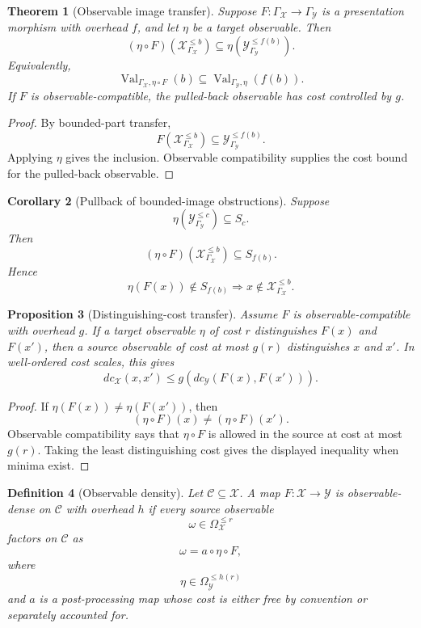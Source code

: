 \documentclass[11pt]{article}
\newtheorem{theorem}{Theorem}[section]
\newtheorem{proposition}[theorem]{Proposition}
\newtheorem{corollary}[theorem]{Corollary}
\newtheorem{definition}[theorem]{Definition}
\begin{document}
\begin{theorem}[Observable image transfer]
Suppose \(F:\Gamma_\mathcal X\to\Gamma_\mathcal Y\) is a presentation morphism with overhead \(f\), and let \(\eta\) be a target observable. Then
\[
(\eta\circ F)(\mathcal X_{\Gamma_\mathcal X}^{\leq b})
\subseteq
\eta(\mathcal Y_{\Gamma_\mathcal Y}^{\leq f(b)}).
\]
Equivalently,
\[
\operatorname{Val}_{\Gamma_\mathcal X,\eta\circ F}(b)
\subseteq
\operatorname{Val}_{\Gamma_\mathcal Y,\eta}(f(b)).
\]
If \(F\) is observable-compatible, the pulled-back observable has cost controlled by \(g\).
\end{theorem}

\begin{proof}
By bounded-part transfer,
\[
F(\mathcal X_{\Gamma_\mathcal X}^{\leq b})
\subseteq
\mathcal Y_{\Gamma_\mathcal Y}^{\leq f(b)}.
\]
Applying \(\eta\) gives the inclusion. Observable compatibility supplies the cost bound for the pulled-back observable.
\end{proof}

\begin{corollary}[Pullback of bounded-image obstructions]
Suppose
\[
\eta(\mathcal Y_{\Gamma_\mathcal Y}^{\leq c})\subseteq S_c.
\]
Then
\[
(\eta\circ F)(\mathcal X_{\Gamma_\mathcal X}^{\leq b})
\subseteq
S_{f(b)}.
\]
Hence
\[
\eta(F(x))\notin S_{f(b)}
\Longrightarrow
x\notin\mathcal X_{\Gamma_\mathcal X}^{\leq b}.
\]
\end{corollary}

\begin{proposition}[Distinguishing-cost transfer]
Assume \(F\) is observable-compatible with overhead \(g\). If a target observable \(\eta\) of cost \(r\) distinguishes \(F(x)\) and \(F(x')\), then a source observable of cost at most \(g(r)\) distinguishes \(x\) and \(x'\). In well-ordered cost scales, this gives
\[
dc_{\mathcal X}(x,x')
\leq
g(dc_{\mathcal Y}(F(x),F(x'))).
\]
\end{proposition}

\begin{proof}
If \(\eta(F(x))\ne\eta(F(x'))\), then
\[
(\eta\circ F)(x)\ne(\eta\circ F)(x').
\]
Observable compatibility says that \(\eta\circ F\) is allowed in the source at cost at most \(g(r)\). Taking the least distinguishing cost gives the displayed inequality when minima exist.
\end{proof}

\begin{definition}[Observable density]
Let \(\mathcal C\subseteq\mathcal X\). A map \(F:\mathcal X\to\mathcal Y\) is observable-dense on \(\mathcal C\) with overhead \(h\) if every source observable
\[
\omega\in\Omega_\mathcal X^{\leq r}
\]
factors on \(\mathcal C\) as
\[
\omega=a\circ\eta\circ F,
\]
where
\[
\eta\in\Omega_\mathcal Y^{\leq h(r)}
\]
and \(a\) is a post-processing map whose cost is either free by convention or separately accounted for.
\end{definition}
\end{document}
